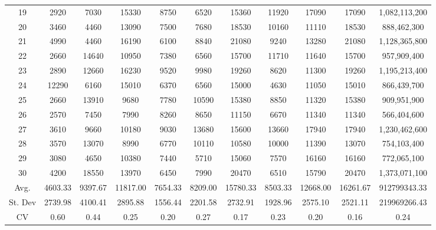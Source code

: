 \documentclass[journal]{IEEEtran}
\begin{document}
\begin{table}
\begin{tabular}{|c|cccccccc|cc|}
19	&	2920	&	7030	&	15330	&	8750	&	6520	&	15360	&	11920	&	17090	&	17090	&	1,082,113,200	\\
20	&	3460	&	4460	&	13090	&	7500	&	7680	&	18530	&	10160	&	11110	&	18530	&	888,462,300	\\
21	&	4990	&	4460	&	16190	&	6100	&	8840	&	21080	&	9240	&	13280	&	21080	&	1,128,365,800	\\
22	&	2660	&	14640	&	10950	&	7380	&	6560	&	15700	&	11710	&	11640	&	15700	&	957,909,400	\\
23	&	2890	&	12660	&	16230	&	9520	&	9980	&	19260	&	8620	&	11300	&	19260	&	1,195,213,400	\\
24	&	12290	&	6160	&	15010	&	6370	&	6560	&	15000	&	4630	&	11050	&	15010	&	866,439,700	\\
25	&	2660	&	13910	&	9680	&	7780	&	10590	&	15380	&	8850	&	11320	&	15380	&	909,951,900	\\
26	&	2570	&	7450	&	7990	&	8260	&	8650	&	11150	&	6670	&	11340	&	11340	&	566,404,600	\\
27	&	3610	&	9660	&	10180	&	9030	&	13680	&	15600	&	13660	&	17940	&	17940	&	1,230,462,600	\\
28	&	3570	&	13070	&	8990	&	6770	&	10110	&	10580	&	10000	&	11390	&	13070	&	754,103,400	\\
29	&	3080	&	4650	&	10380	&	7440	&	5710	&	15060	&	7570	&	16160	&	16160	&	772,065,100	\\
30	&	4200	&	18550	&	13970	&	6450	&	7990	&	20470	&	6510	&	15790	&	20470	&	1,373,071,100	\\
\hline
Avg.	&	4603.33	&	9397.67	&	11817.00	&	7654.33	&	8209.00	&	15780.33	&	8503.33	&	12668.00	&	16261.67	&	912799343.33	\\
St. Dev	&	2739.98	&	4100.41	&	2895.88	&	1556.44	&	2201.58	&	2732.91	&	1928.96	&	2575.10	&	2521.11	&	219969266.43	\\
CV	&	0.60	&	0.44	&	0.25	&	0.20	&	0.27	&	0.17	&	0.23	&	0.20	&	0.16	&	0.24	\\
\hline
\end{tabular}
\end{table}
\end{document}
